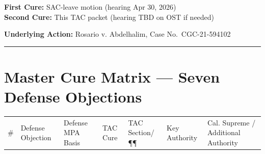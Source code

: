 \textbf{First Cure:} SAC-leave motion (hearing Apr 30, 2026)\\
\textbf{Second Cure:} This TAC packet (hearing TBD on OST if needed)

\textbf{Underlying Action:} Rosario v. Abdelhalim, Case No.~CGC-21-594102

\begin{center}\rule{0.5\linewidth}{0.5pt}\end{center}

\section{Master Cure Matrix --- Seven Defense Objections}\label{master-cure-matrix-seven-defense-objections}

{\def\LTcaptype{table} %
\begin{longtable}[]{@{}
  >{\raggedright\arraybackslash}p{}
  >{\raggedright\arraybackslash}p{}
  >{\raggedright\arraybackslash}p{}
  >{\raggedright\arraybackslash}p{}
  >{\raggedright\arraybackslash}p{}
  >{\raggedright\arraybackslash}p{}
  >{\raggedright\arraybackslash}p{}@{}}
\toprule\noalign{}
\begin{minipage}[b]{\linewidth}\raggedright
\#
\end{minipage} & \begin{minipage}[b]{\linewidth}\raggedright
Defense Objection
\end{minipage} & \begin{minipage}[b]{\linewidth}\raggedright
Defense MPA Basis
\end{minipage} & \begin{minipage}[b]{\linewidth}\raggedright
TAC Cure
\end{minipage} & \begin{minipage}[b]{\linewidth}\raggedright
TAC Section/¶¶
\end{minipage} & \begin{minipage}[b]{\linewidth}\raggedright
Key Authority
\end{minipage} & \begin{minipage}[b]{\linewidth}\raggedright
Cal. Supreme / Additional Authority
\end{minipage} \\

\end{longtable}}
